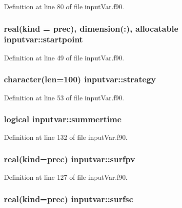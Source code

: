 Definition at line 80 of file input\-Var.\-f90.

\hypertarget{classinputvar_a3b9acf8a358a0bad89d622cbbbab638f}{
\subsubsection[{startpoint}]{\setlength{\rightskip}{0pt plus 5cm}real(kind = prec), dimension(\-:), allocatable inputvar\-::startpoint}}\label{classinputvar_a3b9acf8a358a0bad89d622cbbbab638f}


Definition at line 49 of file input\-Var.\-f90.

\hypertarget{classinputvar_a6e328846c755855ac2ac87d5a63d402a}{
\subsubsection[{strategy}]{\setlength{\rightskip}{0pt plus 5cm}character(len=100) inputvar\-::strategy}}\label{classinputvar_a6e328846c755855ac2ac87d5a63d402a}


Definition at line 53 of file input\-Var.\-f90.

\hypertarget{classinputvar_aec499a973401b90a01f106d089b0e982}{
\subsubsection[{summertime}]{\setlength{\rightskip}{0pt plus 5cm}logical inputvar\-::summertime}}\label{classinputvar_aec499a973401b90a01f106d089b0e982}


Definition at line 132 of file input\-Var.\-f90.

\hypertarget{classinputvar_a96c41574bce3d9f6f6493a87e1a5147e}{
\subsubsection[{surfpv}]{\setlength{\rightskip}{0pt plus 5cm}real(kind=prec) inputvar\-::surfpv}}\label{classinputvar_a96c41574bce3d9f6f6493a87e1a5147e}


Definition at line 127 of file input\-Var.\-f90.

\hypertarget{classinputvar_a8a591d3ec84f2b1c645a06110935e7cd}{
\subsubsection[{surfsc}]{\setlength{\rightskip}{0pt plus 5cm}real(kind=prec) inputvar\-::surfsc}}\label{classinputvar_a8a591d3ec84f2b1c645a06110935e7cd}


